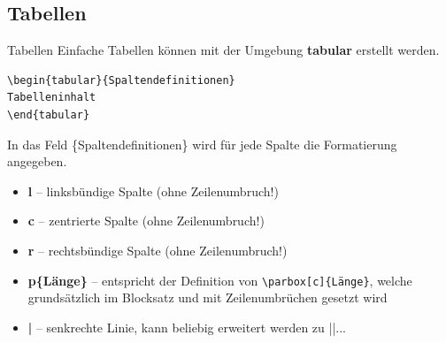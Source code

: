 \subsection{Tabellen}
\begin{frame}[fragile]{Tabellen}
Einfache Tabellen können mit der Umgebung \textbf{tabular} erstellt werden.
\begin{lstlisting}[style=tex]
\begin{tabular}{Spaltendefinitionen}
Tabelleninhalt
\end{tabular}
\end{lstlisting}

In das Feld \{Spaltendefinitionen\} wird für jede Spalte die Formatierung angegeben. \\

\begin{itemize}
	\item \textbf{l} -- linksbündige Spalte (ohne Zeilenumbruch!) 
	\item \textbf{c} -- zentrierte Spalte (ohne Zeilenumbruch!)
	\item \textbf{r} -- rechtsbündige Spalte (ohne Zeilenumbruch!)
	\item \textbf{p\{Länge\}} -- entspricht der Definition von \texttt{\textbackslash parbox[c]\{Länge\}}, welche grundsätzlich im Blocksatz und mit Zeilenumbrüchen gesetzt wird
	\item \textbf{|} -- senkrechte Linie, kann beliebig erweitert werden zu ||...
\end{itemize}
\end{frame}

